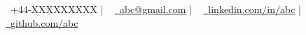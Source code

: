 \begin{center}
    \LARGE{\textbf{\name}}
\end{center}
\vspace{-6.5mm}

\begin{center}
\setlength{\tabcolsep}{15pt}
    \small \raisebox{-0.1\height}\ +44-XXXXXXXXX | ~ \href{mailto:abc@gmail.com}{\raisebox{-0.2\height}\  \underline{abc@gmail.com}} | ~ \href{https://linkedin.com/in/abc}{\raisebox{-0.2\height}\ \underline{linkedin.com/in/abc}} | ~
    \href{https://github.com/abc}{\raisebox{-0.2\height}\ \underline{github.com/abc}} %
    \vspace{-5pt}
\end{center}
\vspace{-3mm}